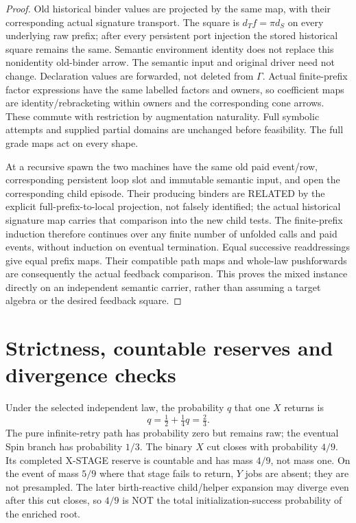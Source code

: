 \documentclass{article}
\begin{document}
\begin{proof}
Old historical binder values are projected by the same map, with their corresponding actual signature transport. The square is $d_T f=\pi d_S$ on every underlying raw prefix; after every persistent port injection the stored historical square remains the same. Semantic environment identity does not replace this nonidentity old-binder arrow. The semantic input and original driver need not change. Declaration values are forwarded, not deleted from $\Gamma$. Actual finite-prefix factor expressions have the same labelled factors and owners, so coefficient maps are identity/rebracketing within owners and the corresponding cone arrows. These commute with restriction by augmentation naturality. Full symbolic attempts and supplied partial domains are unchanged before feasibility. The full grade maps act on every shape.

At a recursive spawn the two machines have the same old paid event/row, corresponding persistent loop slot and immutable semantic input, and open the corresponding child episode. Their producing binders are RELATED by the explicit full-prefix-to-local projection, not falsely identified; the actual historical signature map carries that comparison into the new child tests. The finite-prefix induction therefore continues over any finite number of unfolded calls and paid events, without induction on eventual termination. Equal successive readdressings give equal prefix maps. Their compatible path maps and whole-law pushforwards are consequently the actual feedback comparison. This proves the mixed instance directly on an independent semantic carrier, rather than assuming a target algebra or the desired feedback square.
\end{proof}

\section{Strictness, countable reserves and divergence checks}
Under the selected independent law, the probability $q$ that one $X$ returns is
\[
 q=\tfrac12+\tfrac14q=\tfrac23.
\]
The pure infinite-retry path has probability zero but remains raw; the eventual Spin branch has probability $1/3$. The binary $X$ cut closes with probability $4/9$. Its completed X-STAGE reserve is countable and has mass $4/9$, not mass one. On the event of mass $5/9$ where that stage fails to return, $Y$ jobs are absent; they are not presampled. The later birth-reactive child/helper expansion may diverge even after this cut closes, so $4/9$ is NOT the total initialization-success probability of the enriched root.
\end{document}

